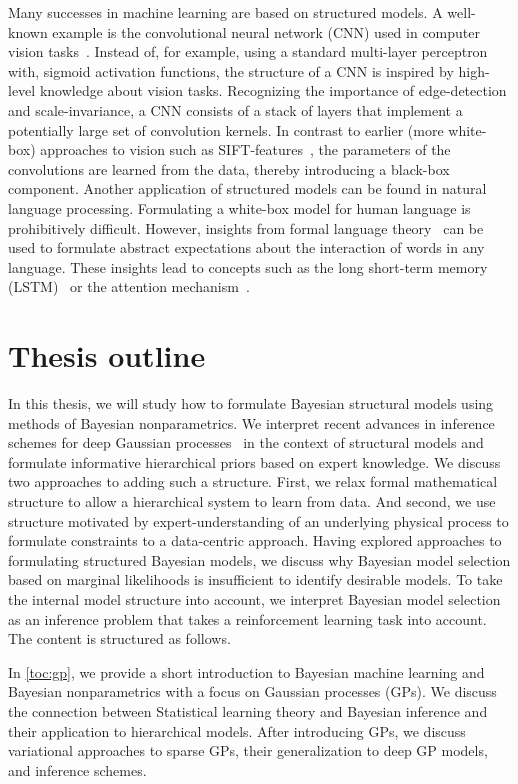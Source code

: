 Many successes in machine learning are based on structured models.
A well-known example is the convolutional neural network (CNN) used in computer vision tasks~\parencite{lecun_backpropagation_1989}.
Instead of, for example, using a standard multi-layer perceptron with, sigmoid activation functions, the structure of a CNN is inspired by high-level knowledge about vision tasks.
Recognizing the importance of edge-detection and scale-invariance, a CNN consists of a stack of layers that implement a potentially large set of convolution kernels.
In contrast to earlier (more white-box) approaches to vision such as SIFT-features~\parencite{lowe_object_1999}, the parameters of the convolutions are learned from the data, thereby introducing a black-box component.
Another application of structured models can be found in natural language processing.
Formulating a white-box model for human language is prohibitively difficult.
However, insights from formal language theory~\parencite{chomsky_aspects_2014} can be used to formulate abstract expectations about the interaction of words in any language.
These insights lead to concepts such as the long short-term memory (LSTM)~\parencite{hochreiter_long_1997} or the attention mechanism~\parencite{bahdanau_neural_2014,chorowski_attention-based_2015}.


\section{Thesis outline}
In this thesis, we will study how to formulate Bayesian structural models using methods of Bayesian nonparametrics.
We interpret recent advances in inference schemes for deep Gaussian processes~\parencite{damianou_deep_2013} in the context of structural models and formulate informative hierarchical priors based on expert knowledge.
We discuss two approaches to adding such a structure.
First, we relax formal mathematical structure to allow a hierarchical system to learn from data.
And second, we use structure motivated by expert-understanding of an underlying physical process to formulate constraints to a data-centric approach.
Having explored approaches to formulating structured Bayesian models, we discuss why Bayesian model selection based on marginal likelihoods is insufficient to identify desirable models.
To take the internal model structure into account, we interpret Bayesian model selection as an inference problem that takes a reinforcement learning task into account.
The content is structured as follows.

In \cref{toc:gp}, we provide a short introduction to Bayesian machine learning and Bayesian nonparametrics with a focus on Gaussian processes (GPs).
We discuss the connection between Statistical learning theory and Bayesian inference and their application to hierarchical models.
After introducing GPs, we discuss variational approaches to sparse GPs, their generalization to deep GP models, and inference schemes.

